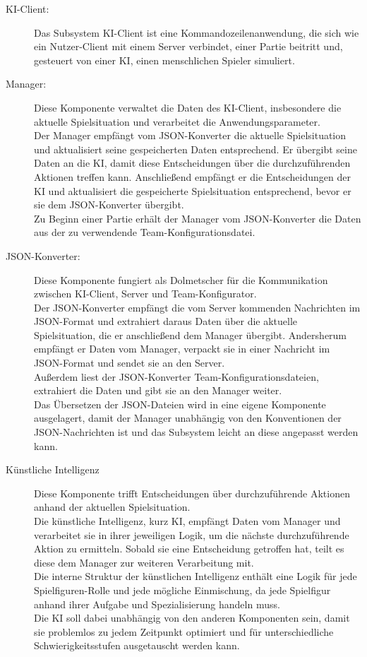 \begin{description}
	\item[KI-Client:] 
	Das Subsystem KI-Client ist eine Kommandozeilenanwendung, die sich wie ein Nutzer-Client mit einem Server verbindet, einer Partie beitritt und, gesteuert von einer KI, einen menschlichen Spieler simuliert. 
	\\
	\item[Manager:]
	Diese Komponente verwaltet die Daten des KI-Client, insbesondere die aktuelle Spielsituation und verarbeitet die Anwendungsparameter.\\ Der Manager empfängt vom JSON-Konverter die aktuelle Spielsituation und aktualisiert seine gespeicherten Daten entsprechend. Er übergibt seine Daten an die KI, damit diese Entscheidungen über die durchzuführenden Aktionen treffen kann. Anschließend empfängt er die Entscheidungen der KI und aktualisiert die gespeicherte Spielsituation entsprechend, bevor er sie dem JSON-Konverter übergibt.\\
	Zu Beginn einer Partie erhält der Manager vom JSON-Konverter die Daten aus der zu verwendende Team-Konfigurationsdatei. 
	\\
	\item[JSON-Konverter:]
	Diese Komponente fungiert als Dolmetscher für die Kommunikation zwischen KI-Client, Server und Team-Konfigurator.\\
	Der JSON-Konverter empfängt die vom Server kommenden Nachrichten im JSON-Format und extrahiert daraus Daten über die aktuelle Spielsituation, die er anschließend dem Manager übergibt. Andersherum empfängt er Daten vom Manager, verpackt sie in einer Nachricht im JSON-Format und sendet sie an den Server.\\
	Außerdem liest der JSON-Konverter Team-Konfigurationsdateien, extrahiert die Daten und gibt sie an den Manager weiter.\\
	Das Übersetzen der JSON-Dateien wird in eine eigene Komponente ausgelagert, damit der Manager unabhängig von den Konventionen der JSON-Nachrichten ist und das Subsystem leicht an diese angepasst werden kann.
	\\
	\item[Künstliche Intelligenz] 
	Diese Komponente trifft Entscheidungen über durchzuführende Aktionen anhand der aktuellen Spielsituation.\\
	Die künstliche Intelligenz, kurz KI, empfängt Daten vom Manager und verarbeitet sie in ihrer jeweiligen Logik, um die nächste durchzuführende Aktion zu ermitteln. Sobald sie eine Entscheidung getroffen hat, teilt es diese dem Manager zur weiteren Verarbeitung mit.\\
	Die interne Struktur der künstlichen Intelligenz enthält eine Logik für jede Spielfiguren-Rolle und jede mögliche Einmischung, da jede Spielfigur anhand ihrer Aufgabe und Spezialisierung handeln muss.\\
	Die KI soll dabei unabhängig von den anderen Komponenten sein, damit sie problemlos zu jedem Zeitpunkt optimiert und für unterschiedliche Schwierigkeitsstufen ausgetauscht werden kann.
\end{description}

